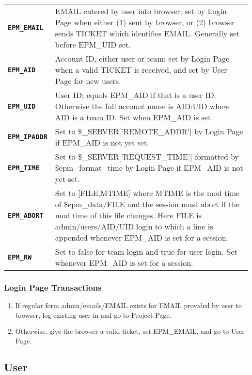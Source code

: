 \documentclass[12pt]{article}
\newenvironment{indpar}[1][0.4in]%
	{\begin{list}{}%
		     {\setlength{\itemsep}{0in}%
		      \setlength{\topsep}{0in}%
		      \setlength{\parsep}{1ex}%
		      \setlength{\labelwidth}{#1}%
		      \setlength{\leftmargin}{#1}%
		      \addtolength{\leftmargin}{\labelsep}}%
	 \item}%
	{\end{list}}
\newcommand{\TT}[1]{{\tt \bfseries #1}}
\begin{document}
\begin{indpar}
\begin{tabular}[t]{lp{4.0in}}
\TT{EPM\_EMAIL}\label{EPM_EMAIL}
    & EMAIL entered by user into browser; set by Login Page when either
      (1) sent by browser, or (2) browser sends TICKET which identifies
      EMAIL.  Generally set before EPM\_UID set.
\\[0.5ex]
\TT{EPM\_AID}\label{EPM_AID}
    & Account ID, either user or team; set by Login Page when a valid
      TICKET is received, and set by User Page for new users.
\\[0.5ex]
\TT{EPM\_UID}\label{EPM_UID}
    & User ID; equals EPM\_AID if that is a user ID.  Otherwise the full
      account name is AID:UID where AID is a team ID.
      Set when EPM\_AID is set.
\\[0.5ex]
\TT{EPM\_IPADDR}\label{EPM_IPADDR}
    & Set to \$\_SERVER['REMOTE\_ADDR'] by Login Page if EPM\_AID is
      not yet set.
\\[0.5ex]
\TT{EPM\_TIME}\label{EPM_TIME}
    & Set to \$\_SERVER['REQUEST\_TIME'] formatted by \$epm\_format\_time
      by Login Page if EPM\_AID is not yet set.
\\[0.5ex]
\TT{EPM\_ABORT}\label{EPM_ABORT}
    & Set to [FILE,MTIME] where MTIME is the mod time of \$epm\_data/FILE
      and the session must abort if the mod time of this file changes.
      Here FILE is admin/users/AID/UID.login to which a line is appended
      whenever EPM\_AID is set for a session.
\\[0.5ex]
\TT{EPM\_RW}\label{EPM_RW}
    & Set to false for team login and true for user login.  Set
      whenever EPM\_AID is set for a session.
\end{tabular}
\end{indpar}


\subsubsection{Login Page Transactions}

\begin{enumerate}
\item If regular form admin/emails/EMAIL exists for EMAIL provided by
      user to browser, log existing
      user in and go to Project Page.
\item Otherwise, give
      the browser a valid ticket, set EPM\_EMAIL,
      and go to User Page.
\end{enumerate}


\subsection{User}
\end{document}

